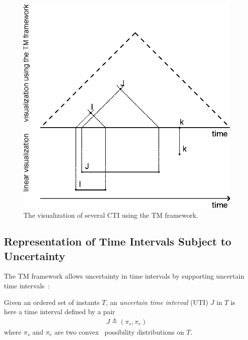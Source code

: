 \begin{figure}[h]
	\centering
	\includegraphics[width=0.9\columnwidth]{graphs/TM_model_several.eps}
	\caption{The visualization of several CTI using the TM framework.}
	\label{fig:tm-const-ex}
\end{figure}
\vspace{-10pt}

\subsection{\label{subsec:tm-interval}Representation of Time Intervals Subject to Uncertainty}
The TM framework allows uncertainty in time intervals by supporting uncertain time intervals~\cite{DeTre2012}:

\begin{definition}
Given an ordered set of instants $T$, an \emph{uncertain time interval} (UTI) $J$ in $T$ is here a time interval defined by a pair
\begin{align}
J \triangleq (\pi_s, \pi_e) \nonumber
\end{align}
where $\pi_s$ and $\pi_e$ are two convex~\cite{Dubois1983} possibility distributions on $T$.
\end{definition}

